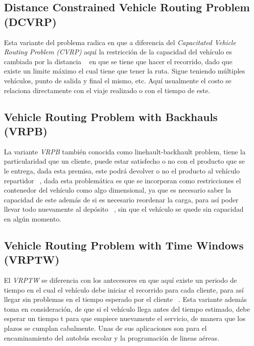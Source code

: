 \documentclass[letter, 10pt]{article}
\begin{document}
\subsection{Distance Constrained Vehicle Routing Problem (DCVRP)}

Esta variante del problema radica en que a diferencia del \emph{Capacitated Vehicle Routing Problem (CVRP)} aqu\'i la restricci\'on de la capacidad
del veh\'iculo es cambiada por la distancia ~\cite{TSP} en que se tiene que hacer el recorrido, dado que existe un limite m\'aximo el cual 
tiene que tener la ruta. Sigue teniendo m\'ultiples veh\'iculos, punto de salida y final el mismo, etc.
Aqu\'i usualmente el costo se relaciona directamente con el viaje realizado o con el tiempo de este.


\subsection{Vehicle Routing Problem with Backhauls (VRPB)}

La variante \emph{VRPB} tambi\'en conocida como linehault-backhault problem, tiene la particularidad que un cliente, puede estar satisfecho o no
con el producto que se le entrega, dada esta premisa, este podr\'a devolver o no el producto al veh\'iculo repartidor ~\cite{Prosser93Hybrid}, 
dada esta problem\'atica
es que se incorporan como restricciones el contenedor del veh\'iculo como algo dimensional, ya que es necesario saber la capacidad 
de este adem\'as 
de si es necesario reordenar la carga, para as\'i poder llevar todo nuevamente al dep\'osito ~\cite{Prosser93Hybrid}, sin que el veh\'iculo se quede sin capacidad en alg\'un 
momento.

\subsection{Vehicle Routing Problem with Time Windows (VRPTW)}

El \emph{VRPTW} se diferencia con los antecesores en que aqu\'i existe un periodo de tiempo en el cual el veh\'iculo debe iniciar el recorrido para
cada cliente, para as\'i llegar sin problemas en el tiempo esperado por el cliente ~\cite{journals/eor/AziGP07}.
Esta variante adem\'as toma en consideraci\'on, de que si el veh\'iculo llega antes del tiempo estimado, debe esperar un tiempo t para que empiece
nuevamente el servicio, de manera que los plazos se cumplan cabalmente. Unas de sus aplicaciones son para el encaminamiento del autob\'us escolar y
la programaci\'on de lineas a\'ereas.
\end{document}
